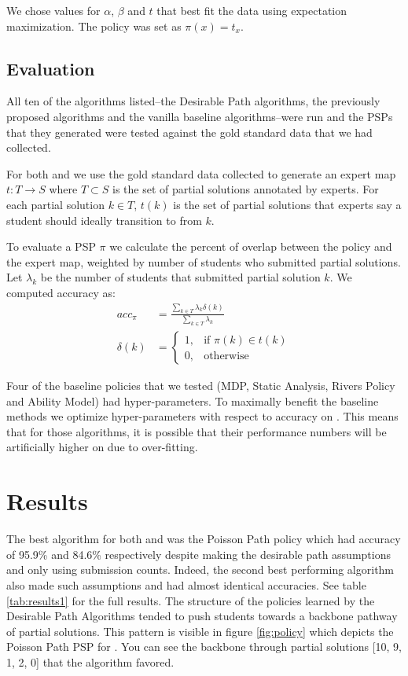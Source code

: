 We chose values for $\alpha$, $\beta$ and $t$ that best fit the data using expectation maximization. The policy was set as $\pi(x) = t_x$.





\subsection{Evaluation}
All ten of the algorithms listed--the Desirable Path algorithms, the previously proposed algorithms and the vanilla baseline algorithms--were run and the PSPs that they generated were tested against the gold standard data that we had collected.

For both \Pa and \Pb we use the gold standard data collected to generate an expert map $t : T \rightarrow S$ where $T \subset S$ is the set of partial solutions annotated by experts. For each partial solution $k \in T$, $t(k)$ is the set of partial solutions that experts say a student should ideally transition to from $k$.

To evaluate a PSP $\pi$ we calculate the percent of overlap between the policy and the expert map, weighted by number of students who submitted partial solutions. Let $\lambda_k$ be the number of students that submitted partial solution $k$. We computed accuracy as:
\begin{align*}
acc_\pi &= \frac{\sum_{k \in T}{\lambda_k \delta(k)}}{\sum_{k \in T}{\lambda_k}}\\
\delta(k) &= 
\begin{cases}
    1,  & \text{if } \pi(k) \in t(k)\\
    0,  & \text{otherwise}
\end{cases}
\end{align*}


Four of the baseline policies that we tested (MDP, Static Analysis, Rivers Policy and Ability Model) had hyper-parameters. To maximally benefit the baseline methods we optimize hyper-parameters with respect to accuracy on \Pa. This means that for those algorithms, it is possible that their performance numbers will be artificially higher on \Pa due to over-fitting.

\section{Results}

The best algorithm for both \Pa and \Pb was the Poisson Path policy which had accuracy of 95.9\% and 84.6\% respectively despite making the desirable path assumptions and only using submission counts. Indeed, the second best performing algorithm also made such assumptions and had almost identical accuracies. See table \ref{tab:results1} for the full results. The structure of the policies learned by the Desirable Path Algorithms tended to push students towards a backbone pathway of partial solutions. This pattern is visible in figure \ref{fig:policy} which depicts the Poisson Path PSP for \Pa\hspace{-0.5mm}. You can see the backbone through partial solutions [10, 9, 1, 2, 0] that the algorithm favored. 

